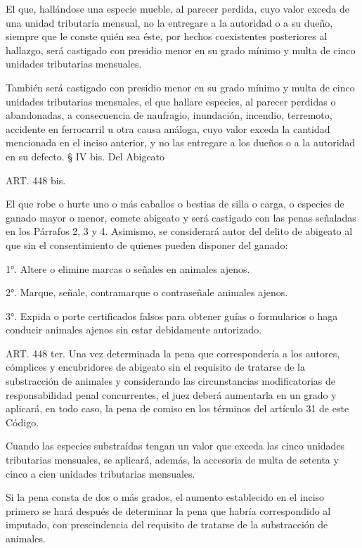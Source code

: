     El que, hallándose una especie mueble, al parecer perdida, cuyo valor exceda de una unidad tributaria mensual, no la entregare a la autoridad o a su dueño, siempre que le conste quién sea éste, por hechos coexistentes posteriores al hallazgo, será castigado con presidio menor en su grado mínimo y multa de cinco unidades tributarias mensuales.

    También será castigado con presidio menor en su grado mínimo y multa de cinco unidades tributarias mensuales, el que hallare especies, al parecer perdidas o abandonadas, a consecuencia de naufragio, inundación, incendio, terremoto, accidente en ferrocarril u otra causa análoga, cuyo valor exceda la cantidad mencionada en el inciso anterior, y no las entregare a los dueños o a la autoridad en su defecto.
    § IV bis. Del Abigeato



    ART. 448 bis.
   
    El que robe o hurte uno o más caballos o bestias de silla o carga, o especies de ganado mayor o menor, comete abigeato y será castigado con las penas señaladas en los Párrafos 2, 3 y 4.
    Asimismo, se considerará autor del delito de abigeato al que sin el consentimiento de quienes pueden disponer del ganado:

    1°. Altere o elimine marcas o señales en animales ajenos.

    2°. Marque, señale, contramarque o contraseñale animales ajenos.

    3°. Expida o porte certificados falsos para obtener guías o formularios o haga conducir animales ajenos sin estar debidamente autorizado.

    ART. 448 ter.
    Una vez determinada la pena que correspondería a los autores, cómplices y encubridores de abigeato sin el requisito de tratarse de la substracción de animales y considerando las circunstancias modificatorias de responsabilidad penal concurrentes, el juez deberá aumentarla en un grado y aplicará, en todo caso, la pena de comiso en los términos del artículo 31 de este Código.

    Cuando las especies substraídas tengan un valor que exceda las cinco unidades tributarias mensuales, se aplicará, además, la accesoria de multa de setenta y cinco a cien unidades tributarias mensuales.

    Si la pena consta de dos o más grados, el aumento establecido en el inciso primero se hará después de determinar la pena que habría correspondido al imputado, con prescindencia del requisito de tratarse de la substracción de animales.

